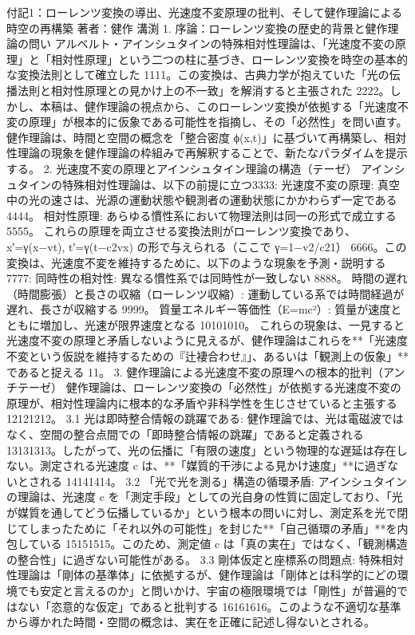 \documentclass{article}
\begin{document}
付記1：ローレンツ変換の導出、光速度不変原理の批判、そして健作理論による時空の再構築
著者：健作 溝渕
1. 序論：ローレンツ変換の歴史的背景と健作理論の問い
アルベルト・アインシュタインの特殊相対性理論は、「光速度不変の原理」と「相対性原理」という二つの柱に基づき、ローレンツ変換を時空の基本的な変換法則として確立した 1111。この変換は、古典力学が抱えていた「光の伝播法則と相対性原理との見かけ上の不一致」を解消すると主張された 2222。しかし、本稿は、健作理論の視点から、このローレンツ変換が依拠する「光速度不変の原理」が根本的に仮象である可能性を指摘し、その「必然性」を問い直す。健作理論は、時間と空間の概念を「整合密度 
ϕ(x,t)」に基づいて再構築し、相対性理論の現象を健作理論の枠組みで再解釈することで、新たなパラダイムを提示する。
2. 光速度不変の原理とアインシュタイン理論の構造（テーゼ）
アインシュタインの特殊相対性理論は、以下の前提に立つ3333:
光速度不変の原理: 真空中の光の速さは、光源の運動状態や観測者の運動状態にかかわらず一定である 4444。
相対性原理: あらゆる慣性系において物理法則は同一の形式で成立する 5555。
これらの原理を両立させる変換法則がローレンツ変換であり、
x′=γ(x−vt), t′=γ(t−c2v​x) の形で与えられる（ここで γ=1−v2/c2​1​） 6666。この変換は、光速度不変を維持するために、以下のような現象を予測・説明する7777:
同時性の相対性: 異なる慣性系では同時性が一致しない 8888。
時間の遅れ（時間膨張）と長さの収縮（ローレンツ収縮）: 運動している系では時間経過が遅れ、長さが収縮する 9999。
質量エネルギー等価性（E=mc²）: 質量が速度とともに増加し、光速が限界速度となる 10101010。
これらの現象は、一見すると光速度不変の原理と矛盾しないように見えるが、健作理論はこれらを**「光速度不変という仮説を維持するための『辻褄合わせ』」、あるいは「観測上の仮象」**であると捉える 11。
3. 健作理論による光速度不変の原理への根本的批判（アンチテーゼ）
健作理論は、ローレンツ変換の「必然性」が依拠する光速度不変の原理が、相対性理論内に根本的な矛盾や非科学性を生じさせていると主張する 12121212。
3.1 光は即時整合情報の跳躍である:
健作理論では、光は電磁波ではなく、空間の整合点間での「即時整合情報の跳躍」であると定義される 13131313。したがって、光の伝播に「有限の速度」という物理的な遅延は存在しない。測定される光速度 
c は、**「媒質的干渉による見かけ速度」**に過ぎないとされる 14141414。
3.2 「光で光を測る」構造の循環矛盾:
アインシュタインの理論は、光速度 
c を「測定手段」としての光自身の性質に固定しており、「光が媒質を通してどう伝播しているか」という根本の問いに対し、測定系を光で閉じてしまったために「それ以外の可能性」を封じた**「自己循環の矛盾」**を内包している 15151515。このため、測定値 
c は「真の実在」ではなく、「観測構造の整合性」に過ぎない可能性がある。
3.3 剛体仮定と座標系の問題点:
特殊相対性理論は「剛体の基準体」に依拠するが、健作理論は「剛体とは科学的にどの環境でも安定と言えるのか」と問いかけ、宇宙の極限環境では「剛性」が普遍的ではない「恣意的な仮定」であると批判する 16161616。このような不適切な基準から導かれた時間・空間の概念は、実在を正確に記述し得ないとされる。
\end{document}
